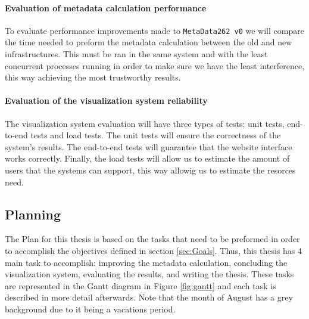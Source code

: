 \documentclass[runningheads]{llncs}
\begin{document}
\paragraph{Evaluation of metadata calculation performance}
To evaluate performance improvements made to \texttt{MetaData262 v0} we will compare the time needed to preform the metadata calculation between the old and new infrastructures. This must be ran in the same system and with the least concurrent processes running in order to make sure we have the least interference, this way achieving the most trustworthy results.



\paragraph{Evaluation of the visualization system reliability}
The visualization system evaluation will have three types of tests: unit tests, end-to-end tests and load tests. The unit tests will ensure the correctness of the system's results. The end-to-end tests will guarantee that the website interface works correctly. Finally, the load tests will allow us to estimate the amount of users that the systems can support, this way allowig us to estimate the resorces need.



\subsection{Planning}
\label{sub:planning}


The Plan for this thesis is based on the tasks that need to be preformed in order to accomplish the objectives defined in section \ref{sec:Goals}. Thus, this thesis has 4 main task to accomplish: improving the metadata calculation, concluding the visualization system, evaluating the results, and writing the thesis. These tasks are represented in the Gantt diagram in Figure \ref{fig:gantt} and each task is described in more detail afterwards. Note that the month of August has a grey background due to it being a vacations period.
\end{document}
